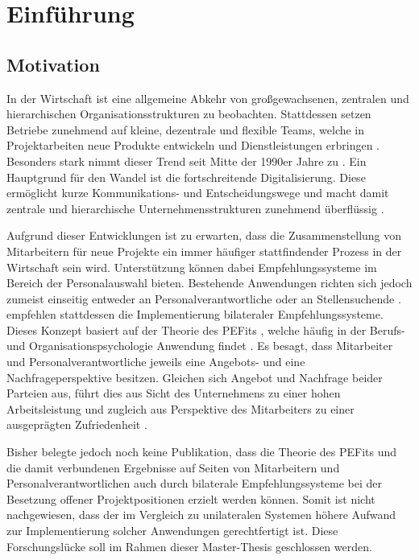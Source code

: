 \chapter{Einführung}
\label{ch:intro}

\section{Motivation}
\label{sec:intro:motivation}
In der Wirtschaft ist eine allgemeine Abkehr von großgewachsenen, zentralen und hierarchischen Organisationsstrukturen zu beobachten. Stattdessen setzen Betriebe zunehmend auf kleine, dezentrale und flexible Teams, welche in Projektarbeiten neue Produkte entwickeln und Dienstleistungen erbringen \cite[S. 2f.]{elanceEconomy:1999}. Besonders stark nimmt dieser Trend seit Mitte der 1990er Jahre zu \cite[S. 8]{whittington:1999}. Ein Hauptgrund für den Wandel ist die fortschreitende Digitalisierung. Diese ermöglicht kurze Kommunikations- und Entscheidungswege und macht damit zentrale und hierarchische Unternehmensstrukturen zunehmend überflüssig \cite[S. 5]{elanceEconomy:1999}.

Aufgrund dieser Entwicklungen ist zu erwarten, dass die Zusammenstellung von Mitarbeitern für neue Projekte ein immer häufiger stattfindender Prozess in der Wirtschaft sein wird. Unterstützung können dabei Empfehlungssysteme im Bereich der Personalauswahl bieten. Bestehende Anwendungen richten sich jedoch zumeist einseitig entweder an Personalverantwortliche oder an Stellensuchende \cite[S. 2f.]{siting:2012}. \textcite[S. 1ff.]{malinowski:2006} empfehlen stattdessen die Implementierung bilateraler Empfehlungssysteme. Dieses Konzept basiert auf der Theorie des \aclp{PEFit} \cite[S. 3.f]{malinowski:2006}, welche häufig in der Berufs- und Organisationspsychologie Anwendung findet \cite[S. 2]{guan:2021}. Es besagt, dass Mitarbeiter und Personalverantwortliche jeweils eine Angebots- und eine Nachfrageperspektive besitzen. Gleichen sich Angebot und Nachfrage beider Parteien aus, führt dies aus Sicht des Unternehmens zu einer hohen Arbeitsleistung und zugleich aus Perspektive des Mitarbeiters zu einer ausgeprägten Zufriedenheit \cite[S. 6]{su:2015}.

Bisher belegte jedoch noch keine Publikation, dass die Theorie des \aclp{PEFit} und die damit verbundenen Ergebnisse auf Seiten von Mitarbeitern und Personalverantwortlichen auch durch bilaterale Empfehlungssysteme bei der Besetzung offener Projektpositionen erzielt werden können. Somit ist nicht nachgewiesen, dass der im Vergleich zu unilateralen Systemen höhere Aufwand zur Implementierung solcher Anwendungen gerechtfertigt ist. Diese Forschungslücke soll im Rahmen dieser Master-Thesis geschlossen werden.

